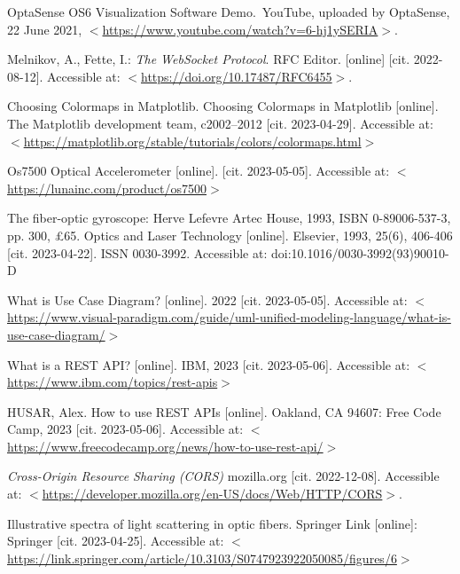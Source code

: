 \begin{thebibliography}{99}
OptaSense OS6 Visualization Software Demo. YouTube, uploaded by OptaSense, 22 June 2021, \(<\)\url{https://www.youtube.com/watch?v=6-hj1ySERIA}\(>\).

Melnikov, A., Fette, I.: \emph{The WebSocket Protocol}. RFC Editor. [online] [cit. 2022-08-12]. Accessible at: \(<\)\url{https://doi.org/10.17487/RFC6455}\(>\).

Choosing Colormaps in Matplotlib. Choosing Colormaps in Matplotlib [online]. The Matplotlib development team, c2002–2012 [cit. 2023-04-29]. Accessible at: \(<\)\url{https://matplotlib.org/stable/tutorials/colors/colormaps.html}\(>\)

Os7500 Optical Accelerometer [online]. [cit. 2023-05-05]. Accessible at: \(<\)\url{https://lunainc.com/product/os7500}\(>\)

The fiber-optic gyroscope: Herve Lefevre Artec House, 1993, ISBN 0-89006-537-3, pp. 300, £65. Optics and Laser Technology [online]. Elsevier, 1993, 25(6), 406-406 [cit. 2023-04-22]. ISSN 0030-3992. Accessible at: doi:10.1016/0030-3992(93)90010-D

What is Use Case Diagram? [online]. 2022 [cit. 2023-05-05]. Accessible at: \(<\)\url{https://www.visual-paradigm.com/guide/uml-unified-modeling-language/what-is-use-case-diagram/}\(>\)

What is a REST API? [online]. IBM, 2023 [cit. 2023-05-06]. Accessible at: \(<\)\url{https://www.ibm.com/topics/rest-apis}\(>\)

HUSAR, Alex. How to use REST APIs [online]. Oakland, CA 94607: Free Code Camp, 2023 [cit. 2023-05-06]. Accessible at: \(<\)\url{https://www.freecodecamp.org/news/how-to-use-rest-api/}\(>\)

\emph{Cross-Origin Resource Sharing (CORS)} mozilla.org [cit. 2022-12-08]. Accessible at: \(<\)\url{https://developer.mozilla.org/en-US/docs/Web/HTTP/CORS}\(>\).

Illustrative spectra of light scattering in optic fibers. Springer Link [online]: Springer [cit. 2023-04-25]. Accessible at: \(<\)\url{https://link.springer.com/article/10.3103/S0747923922050085/figures/6}\(>\)


\end{thebibliography}
